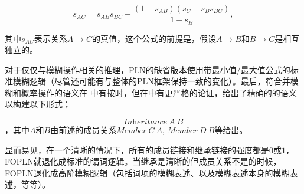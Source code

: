 $$s_{AC}=s_{AB}s_{BC}+\frac{\left(1-s_{AB}\right)\left(s_C-s_Bs_{BC}\right)}{1-s_B},$$

其中$s_{AC}$表示关系$A\rightarrow C$的真值，这个公式的前提是，假设$A\rightarrow B$和$B\rightarrow C$是相互独立的。

对于仅仅与模糊操作相关的推理，PLN的缺省版本使用带最小值/最大值公式的标准模糊逻辑（尽管还可能有与整体的PLN框架保持一致的变化）。最后，符合并模糊和概率操作的语义在\cite{Goertzel2008} 中有按时，但在\cite{Goertzel2010e}中有更严格的论证，给出了精确的的语义以构建以下形式；

$$
\textit{Inheritance} \ A \  B
$$，其中$A$和$B$由前述的成员关系$\textit{Member}\ C\ A$, $\textit{Member}\ D\ B$等给出。

显而易见，在一个清晰的情况下，所有的成员链接和继承链接的强度都是$0$或$1$，FOPLN就退化成标准的谓词逻辑。当继承是清晰的但成员关系不是的时候，FOPLN退化成高阶模糊逻辑（包括词项的模糊表述、以及模糊表述本身的模糊表述，等等）。
